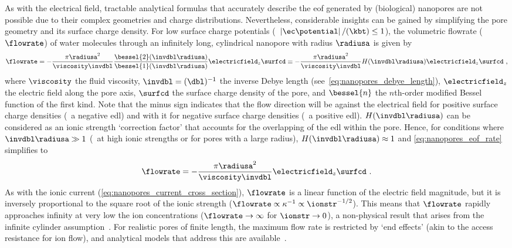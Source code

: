 As with the electrical field, tractable analytical formulas that accurately describe the \gls{eof} generated
by (biological) nanopores are not possible due to their complex geometries and charge distributions.
Nevertheless, considerable insights can be gained by simplifying the pore geometry and its surface charge
density. For low surface charge potentials (\ie~$\left| \ec \potential\right| / (\kbt) \le 1$), the
volumetric flowrate ($\flowrate$) of water molecules through an infinitely long, cylindrical nanopore with
radius $\radiusa$ is given by~\cite{Laohakunakorn-2015}
%
\begin{equation}\label{eq:nanopores_eof_rate}
  \flowrate = - \dfrac{\pi \radiusa^2}{\viscosity \invdbl} 
  \dfrac{ \bessel{2} ( \invdbl \radiusa ) }{ \bessel{1} (\invdbl \radiusa) }
  \electricfield_z \surfcd
  \equiv - \dfrac{\pi \radiusa^2}{\viscosity \invdbl} H(\invdbl \radiusa) \electricfield_z \surfcd
  \text{ ,}
\end{equation}
%
where $\viscosity$ the fluid viscosity, $\invdbl = (\dbl)^{-1}$ the inverse Debye length
(see~\cref{eq:nanopores_debye_length}), $\electricfield_z$ the electric field along the pore axis, $\surfcd$
the surface charge density of the pore, and $\bessel{n}$ the $n$th-order modified Bessel function of the first
kind. Note that the minus sign indicates that the flow direction will be against the electrical field for
positive surface charge densities (\ie~a negative \gls{edl}) and with it for negative surface charge densities
(\ie~a positive \gls{edl}). $H(\invdbl \radiusa)$ can be considered as an ionic strength `correction factor'
that accounts for the overlapping of the \gls{edl} within the pore. Hence, for conditions where $\invdbl
\radiusa \gg 1$ (\eg~at high ionic strengths or for pores with a large radius), $H(\invdbl \radiusa) \approx
1$ and \cref{eq:nanopores_eof_rate} simplifies to
%
\begin{equation}\label{eq:nanopores_eof_rate_simple}
  \flowrate = - \dfrac{\pi \radiusa^2}{\viscosity \invdbl} \electricfield_z \surfcd
  \text{ .}
\end{equation}
%
As with the ionic current (\cref{eq:nanopores_current_cross_section}), $\flowrate$ is a linear function of the
electric field magnitude, but it is inversely proportional to the square root of the ionic strength
($\flowrate \propto \kappa^{-1} \propto \ionstr^{-1/2}$). This means that $\flowrate$ rapidly approaches
infinity at very low the ion concentrations  ($\flowrate \to \infty$ for $\ionstr \to 0$), a non-physical
result that arises from the infinite cylinder assumption~\cite{Mao-2014}. For realistic pores of finite
length, the maximum flow rate is restricted by `end effects' (akin to the access resistance for ion flow), and
analytical models that address this are available~\cite{Sherwood-2014}.

